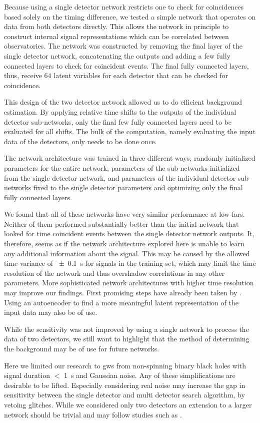 Because using a single detector network restricts one to check for coincidences based solely on the timing difference, we tested a simple network that operates on data from both detectors directly. This allows the network in principle to construct internal signal representations which can be correlated between observatories. The network was constructed by removing the final layer of the single detector network, concatenating the outputs and adding a few fully connected layers to check for coincident events. The final fully connected layers, thus, receive $64$ latent variables for each detector that can be checked for coincidence.

This design of the two detector network allowed us to do efficient background estimation. By applying relative time shifts to the outputs of the individual detector sub-networks, only the final few fully connected layers need to be evaluated for all shifts. The bulk of the computation, namely evaluating the input data of the detectors, only needs to be done once.

The network architecture was trained in three different ways; randomly initialized parameters for the entire network, parameters of the sub-networks initialized from the single detector network, and parameters of the individual detector sub-networks fixed to the single detector parameters and optimizing only the final fully connected layers.

We found that all of these networks have very similar performance at low \acrshort{far}s. Neither of them performed substantially better than the initial network that looked for time coincident events between the single detector network outputs. It, therefore, seems as if the network architecture explored here is unable to learn any additional information about the signal. This may be caused by the allowed time-variance of \SI[parse-numbers=false]{\pm 0.1}{\second} for signals in the training set, which may limit the time resolution of the network and thus overshadow correlations in any other parameters. More sophisticated network architectures with higher time resolution may improve our findings. First promising steps have already been taken by \cite{Wei:2020ztw, Huerta:2020xyq}. Using an autoencoder to find a more meaningful latent representation of the input data may also be of use.

While the sensitivity was not improved by using a single network to process the data of two detectors, we still want to highlight that the method of determining the background may be of use for future networks.

Here we limited our research to \acrshort{gw}s from non-spinning binary black holes with signal duration $<$ \SI{1}{\second} and Gaussian noise. Any of these simplifications are desirable to be lifted. Especially considering real noise may increase the gap in sensitivity between the single detector and multi detector search algorithm, by vetoing glitches. While we considered only two detectors an extension to a larger network should be trivial and may follow studies such as \cite{Davies:2020tsx}.